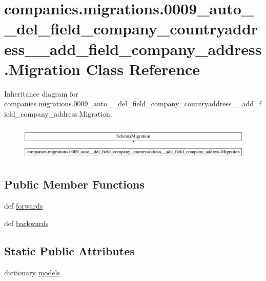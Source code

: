 \hypertarget{classcompanies_1_1migrations_1_10009__auto____del__field__company__countryaddress____add__field__company__address_1_1_migration}{\section{companies.\-migrations.0009\-\_\-auto\-\_\-\-\_\-del\-\_\-field\-\_\-company\-\_\-countryaddress\-\_\-\-\_\-add\-\_\-field\-\_\-company\-\_\-address.Migration Class Reference}
\label{classcompanies_1_1migrations_1_10009__auto____del__field__company__countryaddress____add__field__company__address_1_1_migration}
}
Inheritance diagram for companies.\-migrations.0009\-\_\-auto\-\_\-\-\_\-del\-\_\-field\-\_\-company\-\_\-countryaddress\-\_\-\-\_\-add\-\_\-field\-\_\-company\-\_\-address.Migration\-:\begin{figure}[H]
\begin{center}
\leavevmode
\includegraphics[height=1.717791cm]{classcompanies_1_1migrations_1_10009__auto____del__field__company__countryaddress____add__field__company__address_1_1_migration}
\end{center}
\end{figure}
\subsection*{Public Member Functions}
\begin{DoxyCompactItemize}
\item 
def \hyperlink{classcompanies_1_1migrations_1_10009__auto____del__field__company__countryaddress____add__field__company__address_1_1_migration_ab9f9722bf000e868d7dbf7ab0dc0e9fc}{forwards}
\item 
def \hyperlink{classcompanies_1_1migrations_1_10009__auto____del__field__company__countryaddress____add__field__company__address_1_1_migration_aa37971b834c6534459145015e42436d8}{backwards}
\end{DoxyCompactItemize}
\subsection*{Static Public Attributes}
\begin{DoxyCompactItemize}
\item 
dictionary \hyperlink{classcompanies_1_1migrations_1_10009__auto____del__field__company__countryaddress____add__field__company__address_1_1_migration_a692ee66cd1e41286a779118f43520c18}{models}
\end{DoxyCompactItemize}


